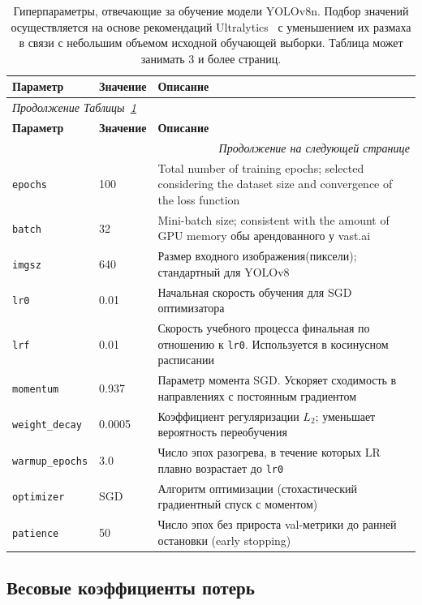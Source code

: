\begin{longtable}{p{3.5cm} p{2.5cm} p{8cm}}
\caption{Гиперпараметры, отвечающие за обучение модели YOLOv8n. Подбор значений осуществляется на основе рекомендаций Ultralytics~\cite{ultralytics2023yolov8} с уменьшением их размаха в связи с небольшим объемом исходной обучающей выборки. Таблица может занимать 3 и более страниц.}
\label{tab:hyperparams} \\
\toprule
\textbf{Параметр} & \textbf{Значение} & \textbf{Описание} \\
\midrule
\endfirsthead
\multicolumn{3}{l}{\textit{Продолжение Таблицы~\ref{tab:hyperparams}}} \\
\toprule
\textbf{Параметр} & \textbf{Значение} & \textbf{Описание} \\
\midrule
\endhead
\midrule
\multicolumn{3}{r}{\textit{Продолжение на следующей странице}} \\
\endfoot
\bottomrule
\endlastfoot
\texttt{epochs} & 100 & Total number of training epochs; selected considering the dataset size and convergence of the loss function \\
\texttt{batch} & 32 & Mini-batch size; consistent with the amount of GPU memory обы арендованного у vast.ai~\cite{vastai2023} \\
\texttt{imgsz} & 640 & Размер входного изображения(пиксели); стандартный для YOLOv8 \\
\texttt{lr0} & 0.01 & Начальная скорость обучения для SGD оптимизатора \\
\texttt{lrf} & 0.01 & Скорость учебного процесса финальная по отношению к \texttt{lr0}. Используется в косинусном расписании \\
\texttt{momentum} & 0.937 & Параметр момента SGD. Ускоряет сходимость в направлениях с постоянным градиентом \\
\texttt{weight\_decay} & 0.0005 & Коэффициент регуляризации $L_2$; уменьшает вероятность переобучения \\
\texttt{warmup\_epochs} & 3.0 & Число эпох разогрева, в течение которых LR плавно возрастает до \texttt{lr0} \\
\texttt{optimizer} & SGD & Алгоритм оптимизации (стохастический градиентный спуск с моментом) \\
\texttt{patience} & 50 & Число эпох без прироста val-метрики до ранней остановки (early stopping) \\
\end{longtable}

\subsection{Весовые коэффициенты потерь}

